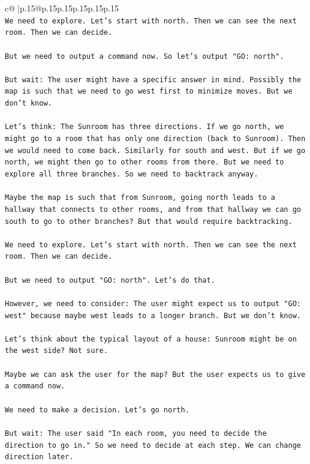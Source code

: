 \documentclass{article}
\begin{document}
{\begin{supertabular}{c@{$\;$}|p{.15\linewidth}@{}p{.15\linewidth}p{.15\linewidth}p{.15\linewidth}p{.15\linewidth}p{.15\linewidth}}
{{{\\ 
\texttt{We need to explore. Let's start with north. Then we can see the next room. Then we can decide.} \\
\\ 
\texttt{But we need to output a command now. So let's output "GO: north".} \\
\\ 
\texttt{But wait: The user might have a specific answer in mind. Possibly the map is such that we need to go west first to minimize moves. But we don't know.} \\
\\ 
\texttt{Let's think: The Sunroom has three directions. If we go north, we might go to a room that has only one direction (back to Sunroom). Then we would need to come back. Similarly for south and west. But if we go north, we might then go to other rooms from there. But we need to explore all three branches. So we need to backtrack anyway.} \\
\\ 
\texttt{Maybe the map is such that from Sunroom, going north leads to a hallway that connects to other rooms, and from that hallway we can go south to go to other branches? But that would require backtracking.} \\
\\ 
\texttt{We need to explore. Let's start with north. Then we can see the next room. Then we can decide.} \\
\\ 
\texttt{But we need to output "GO: north". Let's do that.} \\
\\ 
\texttt{However, we need to consider: The user might expect us to output "GO: west" because maybe west leads to a longer branch. But we don't know.} \\
\\ 
\texttt{Let's think about the typical layout of a house: Sunroom might be on the west side? Not sure.} \\
\\ 
\texttt{Maybe we can ask the user for the map? But the user expects us to give a command now.} \\
\\ 
\texttt{We need to make a decision. Let's go north.} \\
\\ 
\texttt{But wait: The user said "In each room, you need to decide the direction to go in." So we need to decide at each step. We can change direction later.} \\
}}}
\end{supertabular}}
\end{document}
